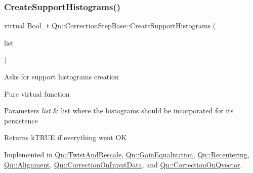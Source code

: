 \mbox{\label{classQn_1_1CorrectionStepBase_a156c05dc7a6a8e149674ccfb11e596c9}} 
\subsubsection{\texorpdfstring{Create\+Support\+Histograms()}{CreateSupportHistograms()}}
{\footnotesize\ttfamily virtual Bool\+\_\+t Qn\+::\+Correction\+Step\+Base\+::\+Create\+Support\+Histograms (\begin{DoxyParamCaption}\item[{T\+List $\ast$}]{list }\end{DoxyParamCaption})\hspace{0.3cm}{\ttfamily [pure virtual]}}

Asks for support histograms creation

Pure virtual function 
\begin{DoxyParams}{Parameters}
{\em list} & list where the histograms should be incorporated for its persistence \\
\hline
\end{DoxyParams}
\begin{DoxyReturn}{Returns}
k\+T\+R\+UE if everything went OK 
\end{DoxyReturn}


Implemented in \mbox{\hyperlink{classQn_1_1TwistAndRescale_a57826092f0c09750fe0f5919e2cdb617}{Qn\+::\+Twist\+And\+Rescale}}, \mbox{\hyperlink{classQn_1_1GainEqualization_a3f34cc42fe078c556d9acf98525490ce}{Qn\+::\+Gain\+Equalization}}, \mbox{\hyperlink{classQn_1_1Recentering_accf0f1282e35bd0a94a2d93312ff6ad5}{Qn\+::\+Recentering}}, \mbox{\hyperlink{classQn_1_1Alignment_ada53d00555fc8a59644b3db5a8584de3}{Qn\+::\+Alignment}}, \mbox{\hyperlink{classQn_1_1CorrectionOnInputData_a1556dd574545ef77d6b462020101bf39}{Qn\+::\+Correction\+On\+Input\+Data}}, and \mbox{\hyperlink{classQn_1_1CorrectionOnQvector_addcdd98787c99ea34a2511be2cdc8de4}{Qn\+::\+Correction\+On\+Qvector}}.

\mbox{\label{classQn_1_1CorrectionStepBase_a5f8936b56bfe4e5a7bf1e79775241500}} 
